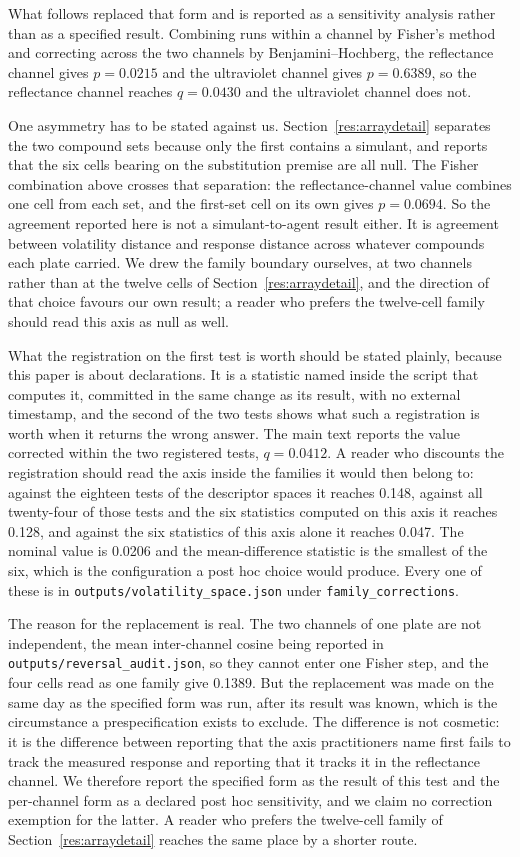 \documentclass[11pt,a4paper]{article}
\begin{document}
What follows replaced that form and is reported as a sensitivity analysis
rather than as a specified result. Combining runs within a channel by
Fisher's method and correcting across the two channels by Benjamini--Hochberg,
the reflectance channel gives $p = 0.0215$ and the ultraviolet channel gives
$p = 0.6389$, so the reflectance
channel reaches $q = 0.0430$ and the ultraviolet channel does not.

One asymmetry has to be stated against us. Section~\ref{res:arraydetail}
separates the two compound sets because only the first contains a simulant, and
reports that the six cells bearing on the substitution premise are all null. The
Fisher combination above crosses that separation: the reflectance-channel value
combines one cell from each set, and the first-set cell on its own gives
$p = 0.0694$. So the agreement reported here is not a simulant-to-agent result
either. It is agreement between volatility distance and response distance across
whatever compounds each plate carried. We drew the family boundary ourselves, at
two channels rather than at the twelve cells of
Section~\ref{res:arraydetail}, and the direction of that choice favours our own
result; a reader who prefers the twelve-cell family should read this axis as
null as well.

What the registration on the first test is worth should be stated plainly,
because this paper is about declarations. It is a statistic named inside the
script that computes it, committed in the same change as its result, with no
external timestamp, and the second of the two tests shows what such a
registration is worth when it returns the wrong answer. The main text reports
the value corrected within the two registered tests, $q = 0.0412$. A reader who
discounts the registration should read the axis inside the families it would
then belong to: against the eighteen tests of the descriptor spaces it reaches
0.148, against all twenty-four of those tests and the six statistics computed on
this axis it reaches 0.128, and against the six statistics of this axis alone it
reaches 0.047. The nominal value is 0.0206 and the mean-difference statistic is
the smallest of the six, which is the configuration a post hoc choice would
produce. Every one of these is in
\texttt{outputs/volatility\_space.json} under \texttt{family\_corrections}.

The reason for the replacement is real. The two channels of one plate are not
independent, the mean inter-channel cosine being reported in
\texttt{outputs/reversal\_audit.json}, so they cannot enter one Fisher step,
and the four cells read as one family give 0.1389. But the replacement was
made on the same day as the specified form was run, after its result was
known, which is the circumstance a prespecification exists to exclude. The
difference is not cosmetic: it is the difference between reporting that the
axis practitioners name first fails to track the measured response and
reporting that it tracks it in the reflectance channel. We therefore report the
specified form as the result of this test and the per-channel form as a
declared post hoc sensitivity, and we claim no correction exemption for the
latter. A reader who prefers the twelve-cell family of
Section~\ref{res:arraydetail} reaches the same place by a shorter route.
\end{document}
